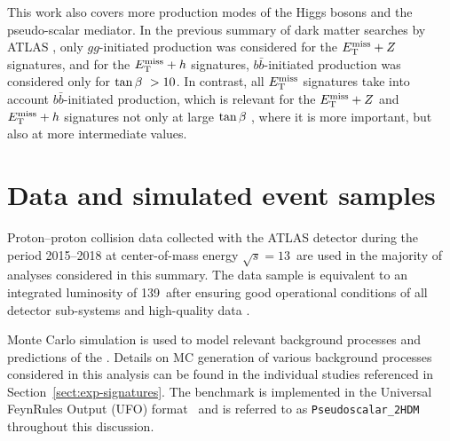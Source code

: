 This work also covers more production modes of the Higgs bosons and the pseudo-scalar mediator. In the previous summary of dark matter searches by ATLAS \cite{EXOT-2017-32}, only $gg$-initiated production was considered for the $E_{\mathrm{T}}^{\mathrm{miss}}+Z$ signatures, and for the $E_{\mathrm{T}}^{\mathrm{miss}}+h$ signatures, $b\bar{b}$-initiated production was considered only for $\tan\beta~>10$. In contrast, all $E_{\mathrm{T}}^{\mathrm{miss}}$ signatures take into account $b\bar{b}$-initiated production, which is relevant for the $E_{\mathrm{T}}^{\mathrm{miss}}+Z$ and $E_{\mathrm{T}}^{\mathrm{miss}}+h$ signatures not only at large $\tan\beta~$, where it is more important, but also at more intermediate values.

\section{Data and simulated event samples}

Proton--proton collision data collected with the ATLAS detector during the period 2015--2018 at center-of-mass energy $\sqrt{s}=13$~\TeV are used in the majority of analyses considered in this summary. The data sample is equivalent to an integrated luminosity of 139~\ifb after ensuring good operational conditions of all detector sub-systems and high-quality data \cite{DAPR-2018-01}.

Monte Carlo simulation is used to model relevant background processes and predictions of the \hdma. Details on MC generation of various background processes considered in this analysis can be found in the individual studies referenced in Section~\ref{sect:exp-signatures}. The \thdma benchmark is implemented in the Universal FeynRules Output (UFO) format~\cite{Degrande:2011ua} and is referred to as \texttt{Pseudoscalar\_2HDM} throughout this discussion.

